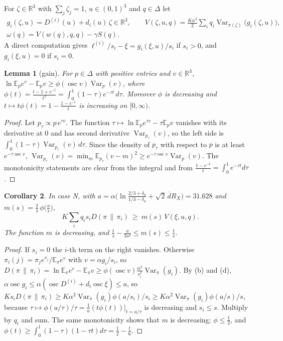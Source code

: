 \documentclass[11pt]{article}
\newtheorem{lemma}{Lemma}[section]
\newtheorem{corollary}[lemma]{Corollary}
\theoremstyle{definition}
\numberwithin{equation}{section}
\newcommand{\R}{\mathbb R}
\newcommand{\KL}[2]{D(#1\,\|\,#2)}
\newcommand{\Var}{\operatorname{Var}}
\newcommand{\osc}{\operatorname{osc}}
\newcommand{\dhi}{\overline d}
\begin{document}
For $\zeta\in\R^3$ with $\sum_j\zeta_j=1$, $u\in(0,1)^3$ and $q\in\Delta$ let
\begin{gather*}
g_i(\zeta,u)=D^{(i)}(u)+d_i(u)\,\zeta\in\R^3,\qquad V(\zeta,u,q)=\frac{K\alpha^2}2\sum_iq_i\Var_{\pi(\zeta)}\bigl(g_i(\zeta,u)\bigr),\\
\omega(q)=V(w(q),q,q)-\gamma S(q).
\end{gather*}
A direct computation gives $\ell^{(i)}/s_i-\xi=g_i(\xi,u)/s_i$ if $s_i>0$, and $g_i(\xi,u)=0$ if $s_i=0$.

\begin{lemma}[gain]\label{lem:gain}
For $p\in\Delta$ with positive entries and $v\in\R^3$, $\ln\mathbb E_pe^{v}-\mathbb E_pv\ge\phi(\osc v)\Var_p(v)$, where
$\phi(t)=\frac{t-1+e^{-t}}{t^2}=\int_0^1(1-\tau)e^{-\tau t}\,d\tau$. Moreover $\phi$ is decreasing and $t\mapsto t\phi(t)=1-\frac{1-e^{-t}}t$
is increasing on $[0,\infty)$.
\end{lemma}
\begin{proof}
Let $p_\tau\propto p\,e^{\tau v}$. The function $\tau\mapsto\ln\mathbb E_pe^{\tau v}-\tau\mathbb E_pv$ vanishes with its derivative at $0$ and has
second derivative $\Var_{p_\tau}(v)$, so the left side is $\int_0^1(1-\tau)\Var_{p_\tau}(v)\,d\tau$. Since the density of $p_\tau$ with
respect to $p$ is at least $e^{-\tau\osc v}$, $\Var_{p_\tau}(v)=\min_m\mathbb E_{p_\tau}(v-m)^2\ge e^{-\tau\osc v}\Var_p(v)$. The monotonicity
statements are clear from the integral and from $\frac{1-e^{-t}}t=\int_0^1e^{-\tau t}d\tau$.
\end{proof}

\begin{corollary}\label{cor:gain}
In case N, with $a=\alpha\bigl(\ln\frac{2/3+\delta_u}{1/3-\delta_u}+\sqrt2\,\dhi R_X\bigr)=31.628$ and $m(s)=\frac2s\,\phi\bigl(\frac as\bigr)$,
\[
K\sum_iq_is_i\KL\pi{\pi_i}\ \ge\ m(s)\,V(\xi,u,q).
\]
The function $m$ is decreasing, and $\frac1s-\frac a{3s^2}\le m(s)\le\frac1s$.
\end{corollary}
\begin{proof}
If $s_i=0$ the $i$-th term on the right vanishes. Otherwise $\pi_i(j)=\pi_je^{v_j}/\mathbb E_\pi e^v$ with $v=\alpha g_i/s_i$, so
$\KL\pi{\pi_i}=\ln\mathbb E_\pi e^v-\mathbb E_\pi v\ge\phi(\osc v)\frac{\alpha^2}{s_i^2}\Var_\pi(g_i)$. By (b) and (d),
$\alpha\osc g_i\le\alpha(\osc D^{(i)}+d_i\osc\xi)\le a$, so $Ks_i\KL\pi{\pi_i}\ge K\alpha^2\Var_\pi(g_i)\phi(a/s_i)/s_i\ge
K\alpha^2\Var_\pi(g_i)\phi(a/s)/s$, because $\tau\mapsto\phi(a/\tau)/\tau=\frac1a(t\phi(t))|_{t=a/\tau}$ is decreasing and $s_i\le s$.
Multiply by $q_i$ and sum. The same monotonicity shows that $m$ is decreasing; $\phi\le\frac12$, and $\phi(t)\ge\int_0^1(1-\tau)(1-\tau t)d\tau
=\frac12-\frac t6$.
\end{proof}
\end{document}
